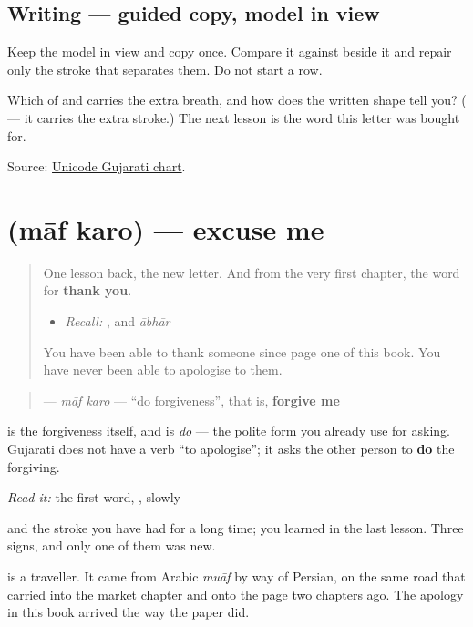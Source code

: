\subsection*{Writing — guided copy, model in view}
Keep the model in view and copy \textbf{} once. Compare it against \textbf{} beside it and repair only the stroke that separates them. Do not start a row.

\begin{tcolorbox}[breakable,colback=teal!4,colframe=teal!35!black,title={Before you move on}]
Which of \textbf{} and \textbf{} carries the extra breath, and how does the written shape tell you? (\textbf{} — it carries the extra stroke.) The next lesson is the word this letter was bought for.

Source: \href{https://www.unicode.org/charts/PDF/U0A80.pdf}{Unicode Gujarati chart}.
\end{tcolorbox}
\section[\texorpdfstring{\gu{માફ} \gu{કરો} (māf karo)}{માફ કરો (māf karo)}]{  (māf karo) — excuse me}

\label{lesson:GU-C31-maaf}



\begin{quote}
One lesson back, the new letter. And from the very first chapter, the word for \textbf{thank you}.

\begin{itemize}
\raggedright
  \item \emph{Recall:} \textbf{}, and \emph{ābhār}
\end{itemize}

You have been able to thank someone since page one of this book. You have never been able to apologise to them.
\end{quote}

\begin{cousinweb}
\begin{quote}
\textbf{ } — \emph{māf karo} — \textquotedblleft{}do forgiveness\textquotedblright{}, that is, \textbf{forgive me}
\end{quote}

\textbf{} is the forgiveness itself, and \textbf{} is \emph{do} — the polite form you already use for asking. Gujarati does not have a verb \textquotedblleft{}to apologise\textquotedblright{}; it asks the other person to \textbf{do} the forgiving.

\emph{Read it:} the first word, \textbf{}, slowly

\textbf{} and the \textbf{} stroke you have had for a long time; \textbf{} you learned in the last lesson. Three signs, and only one of them was new.

\textbf{} is a traveller. It came from Arabic \emph{muāf} by way of Persian, on the same road that carried \textbf{} into the market chapter and \textbf{} onto the page two chapters ago. The apology in this book arrived the way the paper did.
\end{cousinweb}

